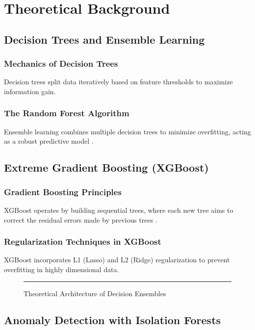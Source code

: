 \documentclass[12pt, a4paper]{report}
\begin{document}
\chapter{Theoretical Background}
\section{Decision Trees and Ensemble Learning}
\subsection{Mechanics of Decision Trees}
Decision trees split data iteratively based on feature thresholds to maximize information gain.
\subsection{The Random Forest Algorithm}
Ensemble learning combines multiple decision trees to minimize overfitting, acting as a robust predictive model \cite{ref10}.

\section{Extreme Gradient Boosting (XGBoost)}
\subsection{Gradient Boosting Principles}
XGBoost operates by building sequential trees, where each new tree aims to correct the residual errors made by previous trees \cite{ref1}.
\subsection{Regularization Techniques in XGBoost}
XGBoost incorporates L1 (Lasso) and L2 (Ridge) regularization to prevent overfitting in highly dimensional data.

\begin{figure}[htbp]
    \centering
    \rule{\textwidth}{6cm} 
    \caption{Theoretical Architecture of Decision Ensembles}
    \label{fig:architecture}
\end{figure}

\section{Anomaly Detection with Isolation Forests}
\end{document}
